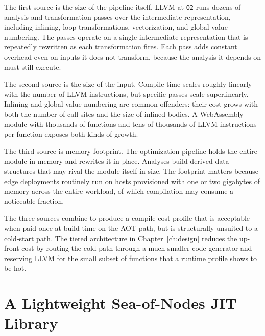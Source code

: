 The first source is the size of the pipeline itself. LLVM at \texttt{O2} runs dozens of analysis and transformation passes over the intermediate representation, including inlining, loop transformations, vectorization, and global value numbering. The passes operate on a single intermediate representation that is repeatedly rewritten as each transformation fires. Each pass adds constant overhead even on inputs it does not transform, because the analysis it depends on must still execute.

The second source is the size of the input. Compile time scales roughly linearly with the number of LLVM instructions, but specific passes scale superlinearly. Inlining and global value numbering are common offenders: their cost grows with both the number of call sites and the size of inlined bodies. A WebAssembly module with thousands of functions and tens of thousands of LLVM instructions per function exposes both kinds of growth.

The third source is memory footprint. The optimization pipeline holds the entire module in memory and rewrites it in place. Analyses build derived data structures that may rival the module itself in size. The footprint matters because edge deployments routinely run on hosts provisioned with one or two gigabytes of memory across the entire workload, of which compilation may consume a noticeable fraction.

The three sources combine to produce a compile-cost profile that is acceptable when paid once at build time on the AOT path, but is structurally unsuited to a cold-start path. The tiered architecture in Chapter~\ref{ch:design} reduces the up-front cost by routing the cold path through a much smaller code generator and reserving LLVM for the small subset of functions that a runtime profile shows to be hot.

\section{A Lightweight Sea-of-Nodes JIT Library}
\label{sec:bg:ir-lib}

